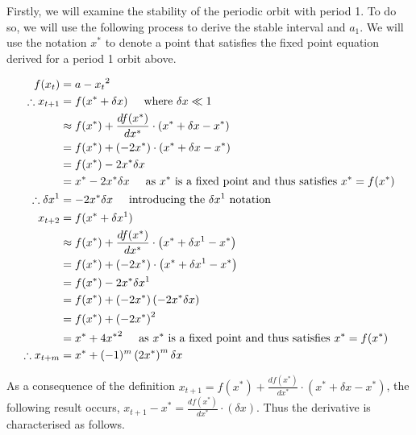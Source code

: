 \documentclass[a4paper]{article}
\begin{document}
\begin{enumerate}[label=\textbf{\arabic*.}]
\begin{enumerate}
		\bigbreak

		Firstly, we will examine the stability of the periodic orbit with period 1. To do so, we will use the following process to derive the stable interval and $a_1$. We will use the notation $x^*$ to denote a point that satisfies the fixed point equation derived for a period 1 orbit above.

		\begin{align*}
		f(x_t) & = a - {x_t}^2\\
		\therefore x_{t+1} & = f(x^* + \delta x) \hspace{5mm} \text{where } \delta x \ll 1\\
		& \approx f(x^*) + \frac{df(x^*)}{dx^*} \cdot \left(x^* + \delta x - x^* \right)\\
		& = f(x^*) + \left(-2x^* \right) \cdot \left(x^* + \delta x - x^* \right)\\
		& = f(x^*) -2x^* \delta x\\
		& = x^* - 2x^* \delta x \hspace{5mm} \text{as } x^* \text{ is a fixed point and thus satisfies } x^* = f(x^*) \\
		\therefore \delta x^1 & = - 2x^*\delta x \hspace{5mm} \text{introducing the } \delta x^1 \text{ notation}\\
		x_{t+2} & = f(x^* + \delta x^1)\\
		& \approx f(x^*) + \frac{df(x^*)}{dx^*} \cdot \left(x^* + \delta x^1 - x^* \right)\\
		& = f(x^*) + \left(-2x^* \right) \cdot \left(x^* + \delta x^1 - x^* \right)\\
		& = f(x^*) -2x^* \delta x^1\\
		& = f(x^*) + \left(-2x^*\right) \left(-2x^*\delta x\right)\\
		& = f(x^*) + \left(-2x^* \right)^2 \\
		& = x^* + 4{x^*}^2 \hspace{5mm} \text{as } x^* \text{ is a fixed point and thus satisfies } x^* = f(x^*) \\
		\therefore x_{t+m} & = x^* + (-1)^m \left(2x^* \right)^m \delta x\\
		\end{align*}

		As a consequence of the definition $\displaystyle{x_{t+1} = f(x^*) + \frac{df(x^*)}{dx^*} \cdot \left(x^* + \delta x - x^* \right)}$, the following result occurs, $\displaystyle{x_{t+1} - x^* = \frac{df(x^*)}{dx^*} \cdot \left(\delta x \right)}$. Thus the derivative is characterised as follows.


\end{enumerate}
\end{enumerate}
\end{document}
